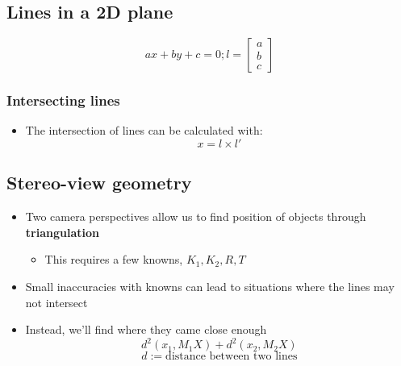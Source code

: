\subsection{Lines in a 2D plane}
$$ax+by+c=0; l=\begin{bmatrix}
	a\\b\\c
\end{bmatrix}$$
\subsubsection{Intersecting lines}
\begin{itemize}
	\item The intersection of lines can be calculated with: 
	$$x=l\times l'$$
\end{itemize}

\subsection{Stereo-view geometry}
\begin{itemize}
	\item Two camera perspectives allow us to find position of objects through \textbf{triangulation}
	\begin{itemize}
		\item This requires a few knowns, $K_1, K_2, R, T$
	\end{itemize}
	\item Small inaccuracies with knowns can lead to situations where the lines may not intersect 
	\item Instead, we'll find where they came close enough
		$$d^2(x_1, M_1X)+d^2(x_2, M_2X)$$
		$$d:=\text{distance between two lines}$$
\end{itemize}

